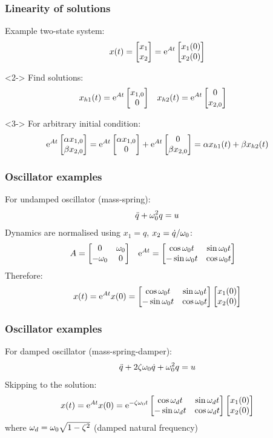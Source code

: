 \documentclass[10pt]{beamer-control}
\begin{document}
\begin{frame}
  \frametitle{Linearity of solutions}
  Example two-state system:
  \begin{align}
    x(t) = \begin{bmatrix}x_1\\x_2\end{bmatrix} = \mathrm{e}^{At}\begin{bmatrix}x_1(0)\\x_2(0)\end{bmatrix}
  \end{align}
  \begin{uncoverenv}<2->
    Find solutions:
    \begin{align}
      x_{h1}(t) &= \mathrm{e}^{At}\begin{bmatrix}x_{1,0}\\0\end{bmatrix} &
      x_{h2}(t) &= \mathrm{e}^{At}\begin{bmatrix}0\\x_{2,0}\end{bmatrix}
    \end{align}
  \end{uncoverenv}
  \begin{uncoverenv}<3->
    For arbitrary initial condition:
    \begin{align}
      \mathrm{e}^{At}\begin{bmatrix}\alpha x_{1,0}\\\beta x_{2,0}\end{bmatrix} = \mathrm{e}^{At}\begin{bmatrix}\alpha x_{1,0}\\0\end{bmatrix} + \mathrm{e}^{At}\begin{bmatrix}0\\\beta x_{2,0}\end{bmatrix} = \alpha x_{h1}(t) + \beta x_{h2}(t)
    \end{align}
  \end{uncoverenv}
\end{frame}

\begin{frame}
  \frametitle{Oscillator examples}
  For undamped oscillator (mass-spring):
  \begin{align}
    \ddot q + \omega_0^2 q  = u
  \end{align}
  Dynamics are normalised using $x_1=q$, $x_2 = \dot q/\omega_0$:
  \begin{align}
    A &= \begin{bmatrix}0 & \omega_0\\ -\omega_0 & 0\end{bmatrix} & \mathrm{e}^{At} &= \begin{bmatrix} \cos \omega_0 t & \sin \omega_0 t \\ -\sin \omega_0 t & \cos \omega_0 t\end{bmatrix}
  \end{align}
  Therefore:
  \begin{align}
    x(t) = \mathrm{e}^{At} x(0) = \begin{bmatrix} \cos \omega_0 t & \sin \omega_0 t \\ -\sin \omega_0 t & \cos \omega_0 t\end{bmatrix} \begin{bmatrix}x_1(0)\\ x_2(0)\end{bmatrix}
  \end{align}
\end{frame}

\begin{frame}
  \frametitle{Oscillator examples}
  For damped oscillator (mass-spring-damper):
  \begin{align}
    \ddot q + 2 \zeta \omega_0 \dot q + \omega_0^2 q  = u
  \end{align}
  Skipping to the solution:
  \begin{align}
    x(t) = \mathrm{e}^{At} x(0) = \mathrm{e}^{-\zeta\omega_0 t} \begin{bmatrix} \cos \omega_d t & \sin \omega_d t \\ -\sin \omega_d t & \cos \omega_d t\end{bmatrix} \begin{bmatrix}x_1(0)\\ x_2(0)\end{bmatrix}
  \end{align}
  where $\omega_d = \omega_0 \sqrt{1-\zeta^2}$ (damped natural frequency)
\end{frame}
\end{document}
